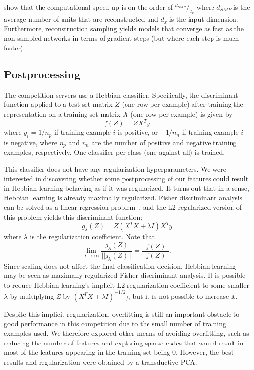 \citep{Dauphin+al-2011} show that the computational speed-up is on the order of
$^{d_{SMP}}/_{d_x}$ where $d_{SMP}$ is the average number of units that are
reconstructed and $d_x$ is the input dimension. Furthermore, reconstruction sampling
yields models that converge as fast as the non-sampled networks in terms of gradient steps
(but where each step is much faster).


\subsection{Postprocessing}

The competition servers use a Hebbian classifier. Specifically,
the discriminant function applied to a test set matrix 
$Z$ (one row per example) after training
the representation on a training set matrix $X$ (one row per example) is given by
\[ f(Z) = Z X^T y \]
where $y_i = 1 / n_p$ if training example $i$ is positive,
or $-1/n_n$ if training example $i$ is negative, where $n_p$ and $n_n$
are the number of positive and negative training examples, respectively.
One classifier per class (one against all) is trained.

This classifier does not have any regularization hyperparameters.
We were interested in discovering whether some postprocessing of our
features could result in Hebbian learning behaving as if it was regularized.
It turns out that in a sense, Hebbian learning is already maximally
regularized. Fisher discriminant analysis can be solved as a linear
regression problem~\citep{bishop-book2006}, and the L2 regularized version
of this problem yields this discriminant function:
\[ g_\lambda(Z) = Z (X^T X + \lambda I) X^T y \]
where $\lambda$ is the regularization coefficient. Note that
\[ \lim_{\lambda\rightarrow\infty} \frac{g_\lambda(Z)}{||g_\lambda(Z)||} = \frac{f(Z)}{||f(Z)||}. \]
Since scaling does not affect the final classification
decision, Hebbian learning may be seen as maximally regularized Fisher
discriminant analysis. It is possible to reduce Hebbian learning's implicit
L2 regularization coefficient 
to some smaller $\lambda$ by multiplying $Z$ by $(X^TX+\lambda I)^{-1/2}$),
but it is not possible to increase it.

Despite this implicit regularization, overfitting is still an important
obstacle to good performance in this competition
due to the small number of training examples used. We therefore explored
other means of avoiding overfitting, such as reducing the number of features
and exploring sparse codes that would result in most of the features
appearing in the training set being 0. However, the best results
and regularization were obtained by a transductive PCA.

